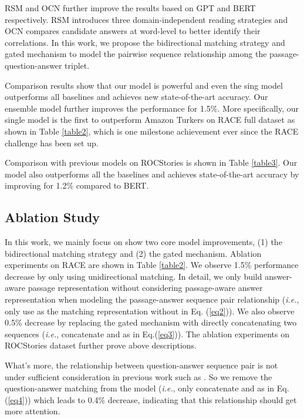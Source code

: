 \documentclass[11pt,a4paper]{article}
\begin{document}
	 
	
	RSM \cite{SunKai-2018} and OCN \cite{ocn} further improve the results based on GPT and BERT respectively. RSM \cite{SunKai-2018} introduces three domain-independent reading strategies and OCN \cite{ocn} compares candidate answers at word-level to better identify their correlations. In this work, we propose the bidirectional matching strategy and gated mechanism to model the pairwise sequence relationship among the passage-question-answer triplet. 
	
	Comparison results show that our model is powerful and even the sing model outperforms all baselines and achieves new state-of-the-art accuracy. Our ensemble model further improves the performance for 1.5\%. More specifically, our single model is the first to outperform Amazon Turkers on RACE full dataset as shown in Table \ref{table2}, which is one milestone achievement ever since the RACE challenge has been set up.


	Comparison with previous models on ROCStories is shown in Table \ref{table3}. Our model also outperforms all the baselines and achieves state-of-the-art accuracy by improving for 1.2\% compared to BERT.
	
	\subsection{Ablation Study} 
	In this work, we mainly focus on show two core model improvements, (1) the bidirectional matching strategy and (2) the gated mechanism. Ablation experiments on RACE are shown in Table \ref{table2}. We observe 1.5\% performance decrease by only using unidirectional matching. In detail, we only build answer-aware passage representation without considering passage-aware answer representation when modeling the passage-answer sequence pair relationship (\emph{i.e.}, only use  as the matching representation without  in Eq. (\ref{eq2})). We also observe 0.5\% decrease by replacing the gated mechanism with directly concatenating two sequences (\emph{i.e.}, concatenate  and  as  in Eq.(\ref{eq3})). The ablation experiments on ROCStories dataset further prove above descriptions. 
	
	What's more, the relationship between question-answer sequence pair is not under sufficient consideration in previous work such as \cite{Wang-2018}. So we remove the question-answer matching from the model (\emph{i.e.}, only concatenate  and  as  in Eq. (\ref{eq4})) which leads to 0.4\% decrease, indicating that this relationship should get more attention. 
	
\end{document}
